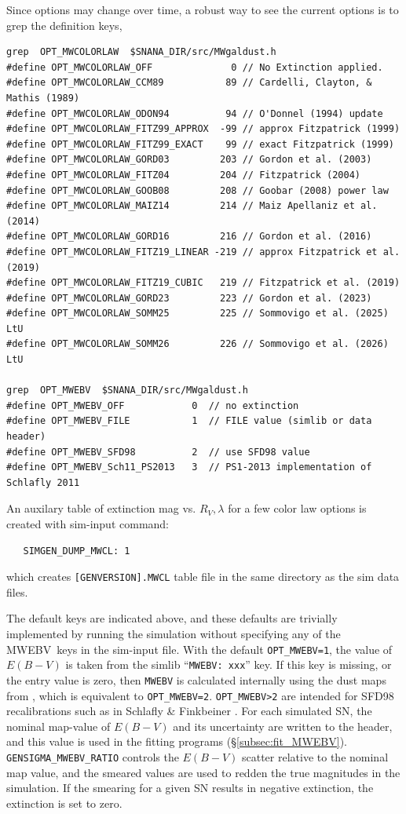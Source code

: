\documentclass[12pt]{article}
\newcommand{\mwebv}{MWEBV}
\begin{document}
{Since options may change over time, a robust
way to see the current options is to grep the definition keys,
%
\begin{Verbatim}[frame=single]
grep  OPT_MWCOLORLAW  $SNANA_DIR/src/MWgaldust.h
#define OPT_MWCOLORLAW_OFF              0 // No Extinction applied.
#define OPT_MWCOLORLAW_CCM89           89 // Cardelli, Clayton, & Mathis (1989)
#define OPT_MWCOLORLAW_ODON94          94 // O'Donnel (1994) update
#define OPT_MWCOLORLAW_FITZ99_APPROX  -99 // approx Fitzpatrick (1999)
#define OPT_MWCOLORLAW_FITZ99_EXACT    99 // exact Fitzpatrick (1999)
#define OPT_MWCOLORLAW_GORD03         203 // Gordon et al. (2003)
#define OPT_MWCOLORLAW_FITZ04         204 // Fitzpatrick (2004)
#define OPT_MWCOLORLAW_GOOB08         208 // Goobar (2008) power law
#define OPT_MWCOLORLAW_MAIZ14         214 // Maiz Apellaniz et al. (2014)
#define OPT_MWCOLORLAW_GORD16         216 // Gordon et al. (2016)
#define OPT_MWCOLORLAW_FITZ19_LINEAR -219 // approx Fitzpatrick et al. (2019)
#define OPT_MWCOLORLAW_FITZ19_CUBIC   219 // Fitzpatrick et al. (2019)
#define OPT_MWCOLORLAW_GORD23         223 // Gordon et al. (2023)
#define OPT_MWCOLORLAW_SOMM25         225 // Sommovigo et al. (2025) LtU
#define OPT_MWCOLORLAW_SOMM26         226 // Sommovigo et al. (2026) LtU

grep  OPT_MWEBV  $SNANA_DIR/src/MWgaldust.h
#define OPT_MWEBV_OFF            0  // no extinction
#define OPT_MWEBV_FILE           1  // FILE value (simlib or data header)
#define OPT_MWEBV_SFD98          2  // use SFD98 value
#define OPT_MWEBV_Sch11_PS2013   3  // PS1-2013 implementation of Schlafly 2011
\end{Verbatim}

An auxilary table of extinction mag vs. $R_V,\lambda$ for a few color law options
is created with sim-input command:
\begin{Verbatim}
   SIMGEN_DUMP_MWCL: 1
\end{Verbatim}
which creates {\tt [GENVERSION].MWCL} table file in the same directory as
the sim data files.

The default keys are indicated above, and these defaults are 
trivially implemented by running the simulation without specifying
any of the \mwebv\ keys in the sim-input file.
With the default {\tt OPT\_MWEBV=1},
the value of $E(B-V)$ is taken from the simlib 
``{\tt MWEBV: xxx}'' key. If this key is missing,
or the entry value is zero, then {\tt MWEBV} is calculated
internally using the dust maps from \cite{Schlegel_98},
which is equivalent to {\tt OPT\_MWEBV=2}.
{\tt OPT\_MWEBV>2} are intended for SFD98 recalibrations
such as in Schlafly \& Finkbeiner \cite{Schlafly_11}. 
For each simulated SN, the nominal map-value of $E(B-V)$ and its
uncertainty are written to the header, and this value is used
in the fitting programs (\S\ref{subsec:fit_MWEBV}).
{\tt GENSIGMA\_MWEBV\_RATIO} controls the $E(B-V)$ scatter
relative to the nominal map value,
and the smeared values are used to redden the true
magnitudes in the simulation.
If the smearing for a given SN results in negative extinction, 
the extinction is set to zero.

}
\end{document}
